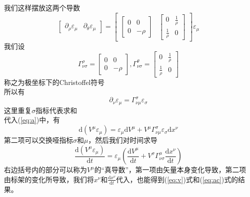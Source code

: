 \documentclass[UTF8]{ctexart}
\begin{document}
我们这样摆放这两个导数
\[\begin{bmatrix}
    \partial_\rho\varepsilon_\mu & \partial_\theta\varepsilon_\mu \end{bmatrix}= \begin{bmatrix}
        \begin{bmatrix}0&0\\0&-\rho\end{bmatrix}&\begin{bmatrix}0&\frac{1}{\rho}\\\frac{1}{\rho}&0\end{bmatrix}
    \end{bmatrix}\varepsilon_\mu
\]
我们设
\[
    \Gamma^\rho_{\nu \sigma}=\begin{bmatrix}0&0\\0&-\rho\end{bmatrix} ,\Gamma^\theta_{\nu \sigma} = \begin{bmatrix}0&\frac{1}{\rho}\\\frac{1}{\rho}&0\end{bmatrix}
\]
称之为极坐标下的Christoffel符号\\
所以有
\[\partial_\nu \varepsilon_\mu = \Gamma^\sigma_{\nu \mu}\varepsilon_\sigma\]
这里重复\(\sigma\)指标代表求和\\
代入(\ref{eq:a})中，有
\[\mathrm{d}(V^\mu \varepsilon_\mu)= \varepsilon_\mu\mathrm{d} V^\mu + V^\mu\Gamma^\sigma_{\nu \mu}\varepsilon_\sigma\mathrm{d} x^\nu\]
第二项可以交换哑指标\(\sigma\)和\(\mu\)，然后我们对时间求导
\[\frac{\mathrm{d}(V^\mu \varepsilon_\mu)}{\mathrm{d} t}= \varepsilon_\mu(\frac{\mathrm{d} V^\mu}{\mathrm{d} t} + V^\sigma\Gamma^\mu_{\nu \sigma}\frac{\mathrm{d} x^\nu}{\mathrm{d} t})\]
右边括号内的部分可以称为\(V^\mu\)的“真导数”，第一项由矢量本身变化导致，第二项由标架的变化所导致，我们将$x^\nu$和$\frac{\mathrm{d} x^\nu}{\mathrm{d} t}$代入，也能得到(\ref{eq:v})式和(\ref{eq:ac})式的结果。
\end{document}
